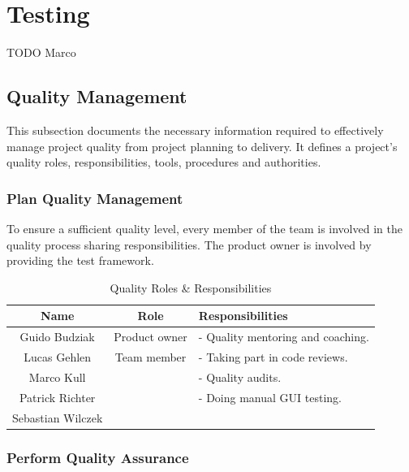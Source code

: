 \section{Testing}
\label{sec:testing}

TODO Marco

\subsection{Quality Management}
\label{ssec:quality_management}

This subsection documents the necessary information required to effectively manage project quality from project planning to delivery. It defines a project’s quality roles, responsibilities, tools, procedures and authorities.

\subsubsection{Plan Quality Management}
\label{ssec:plan_quality}

To ensure a sufficient quality level, every member of the team is involved in the quality process sharing responsibilities. The product owner is involved by providing the test framework.

\begin{table}[H]
    \centering
    \begin{tabular}{|c|c|l|}
        \hline
        \cellcolor{gray}Name & 
        \cellcolor{gray}Role &
        \cellcolor{gray}Responsibilities \\ \hline
        Guido Budziak & Product owner & - Quality mentoring and coaching.\\ \hline
        Lucas Gehlen&Team member&- Taking part in code reviews.\\
        Marco Kull&&- Quality audits.\\
        Patrick Richter&&- Doing manual GUI testing.\\
        Sebastian Wilczek && \\ \hline
    \end{tabular}
    \caption{Quality Roles \& Responsibilities}
    \label{tab:quality_roles}
\end{table}

\subsubsection{Perform Quality Assurance}

